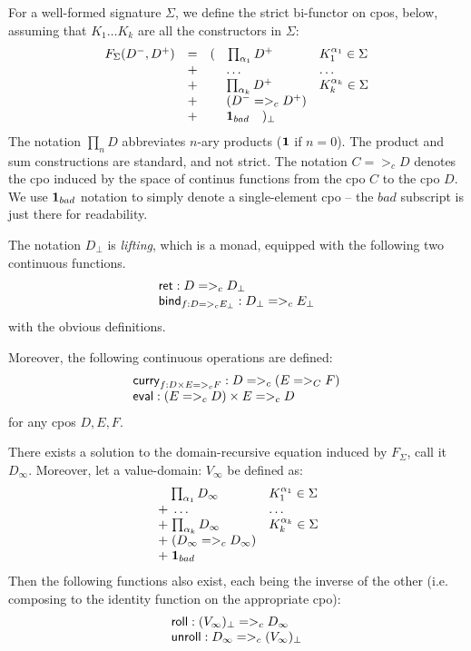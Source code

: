 \documentclass[preprint,nocopyrightspace]{sigplanconf}
\begin{document}
For a well-formed signature $\Sigma$, we define the strict bi-functor on cpos, below, 
assuming that $K_1\ldots K_k$ are all the constructors in $\Sigma$: 
\[\begin{array}{lclll}
  F_{\Sigma}(D^{-},D^{+}) & = & ( \quad{\prod_{\alpha_1}{D^{+}}} & K_1^{\alpha_1} \in \Sigma \\
                      & + & \;\quad\ldots                    & \ldots \\
                      & + & \;\quad{\prod_{\alpha_k}{D^{+}}} & K_k^{\alpha_k} \in \Sigma \\ 
                      & + & \;\quad(D^{-} =>_c D^{+}) \\
                      & + & \;\quad{\sf{\bf 1}}_{bad} \quad )_{\bot}
\end{array}\] 
The notation $\prod_{n}{D}$ abbreviates $n$-ary products (${\sf{\bf 1}}$ if $n = 0$). The product
and sum constructions are standard, and not strict. The notation $C =>_c D$ denotes the cpo 
induced by the space of continus functions from the cpo $C$ to the cpo $D$. We use ${\sf{\bf 1}}_{bad}$ 
notation to simply denote a single-element cpo -- the $bad$ subscript is just there for readability. 

The notation $D_\bot$ is {\em lifting}, which is a monad, equipped with the following two continuous functions.
\[\begin{array}{l}
   \mathsf{ret}   : D =>_c D_\bot \\ 
   \mathsf{bind}_{f : D =>_c E_\bot} : D_\bot =>_c E_\bot
\end{array}\]
with the obvious definitions.

Moreover, the following continuous operations are defined:
\[\begin{array}{l} 
   \mathsf{curry}_{f : D\times E =>_c F} : D =>_c (E =>_C F) \\ 
   \mathsf{eval} : (E =>_c D)\times E =>_c D 
\end{array}\] 
for any cpos $D, E, F$.

\begin{lemma}\label{lem:rec-solution} 
There exists a solution to the domain-recursive equation induced by $F_{\Sigma}$, call it $D_{\infty}$.
Moreover, let a value-domain: $V_{\infty}$ be defined as:
    \[\begin{array}{ll}
             \quad\;{\prod_{\alpha_1}{D_{\infty}}} & K_1^{\alpha_1} \in \Sigma \\
             \; + \;\ldots                    & \ldots \\
             \; + \;{\prod_{\alpha_k}{D_{\infty}}} & K_k^{\alpha_k} \in \Sigma \\ 
             \; + \;(D_{\infty} =>_c D_{\infty}) \\
             \; + \;{\sf{\bf 1}}_{bad} \quad
    \end{array}\]
Then the following functions also exist, each being the inverse of the other (i.e. composing to the identity 
function on the appropriate cpo):
\[\begin{array}{l}
  \mathsf{roll} : (V_{\infty})_\bot =>_c D_{\infty} \\ 
  \mathsf{unroll} : D_{\infty} =>_c (V_{\infty})_\bot
\end{array}\] 
\end{lemma}
\end{document}
